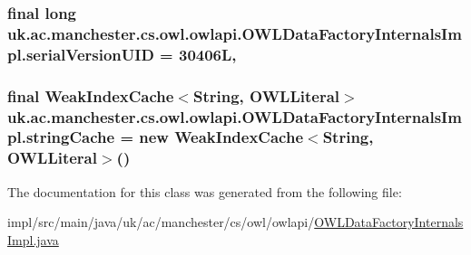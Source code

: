 \hypertarget{classuk_1_1ac_1_1manchester_1_1cs_1_1owl_1_1owlapi_1_1_o_w_l_data_factory_internals_impl_af8d665c4beca0d7769b01e481fe43d4b}{
\subsubsection[{serial\-Version\-U\-I\-D}]{\setlength{\rightskip}{0pt plus 5cm}final long uk.\-ac.\-manchester.\-cs.\-owl.\-owlapi.\-O\-W\-L\-Data\-Factory\-Internals\-Impl.\-serial\-Version\-U\-I\-D = 30406\-L\hspace{0.3cm}{\ttfamily [static]}, {\ttfamily [private]}}}\label{classuk_1_1ac_1_1manchester_1_1cs_1_1owl_1_1owlapi_1_1_o_w_l_data_factory_internals_impl_af8d665c4beca0d7769b01e481fe43d4b}
\hypertarget{classuk_1_1ac_1_1manchester_1_1cs_1_1owl_1_1owlapi_1_1_o_w_l_data_factory_internals_impl_ad642a9c01bc90de5ba8be39b6a6cb94e}{
\subsubsection[{string\-Cache}]{\setlength{\rightskip}{0pt plus 5cm}final Weak\-Index\-Cache$<$String, {\bf O\-W\-L\-Literal}$>$ uk.\-ac.\-manchester.\-cs.\-owl.\-owlapi.\-O\-W\-L\-Data\-Factory\-Internals\-Impl.\-string\-Cache = new Weak\-Index\-Cache$<$String, {\bf O\-W\-L\-Literal}$>$()\hspace{0.3cm}{\ttfamily [private]}}}\label{classuk_1_1ac_1_1manchester_1_1cs_1_1owl_1_1owlapi_1_1_o_w_l_data_factory_internals_impl_ad642a9c01bc90de5ba8be39b6a6cb94e}


The documentation for this class was generated from the following file\-:\begin{DoxyCompactItemize}
\item 
impl/src/main/java/uk/ac/manchester/cs/owl/owlapi/\hyperlink{_o_w_l_data_factory_internals_impl_8java}{O\-W\-L\-Data\-Factory\-Internals\-Impl.\-java}\end{DoxyCompactItemize}
